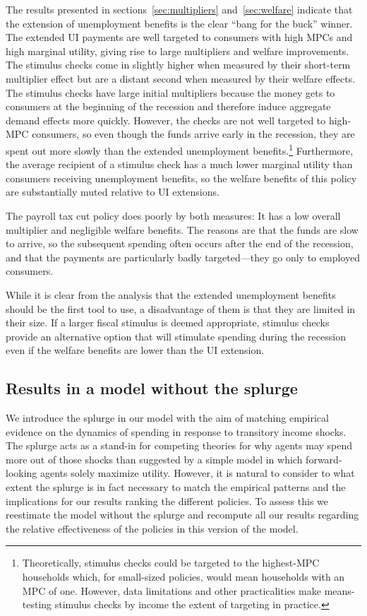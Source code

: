 \documentclass[qe]{econsocart}
\begin{document}
The results presented in sections~\ref{sec:multipliers} and~\ref{sec:welfare} indicate that the extension of unemployment benefits is the clear ``bang for the buck'' winner.
The extended UI payments are well targeted to consumers with high MPCs and high marginal utility, giving rise to large multipliers and welfare improvements.
The stimulus checks come in slightly higher when measured by their short-term multiplier effect but are a distant second when measured by their welfare effects.
The stimulus checks have large initial multipliers because the money gets to consumers at the beginning of the recession and therefore induce aggregate demand effects more quickly.
However, the checks are not well targeted to high-MPC consumers, so even though the funds arrive early in the recession, they are spent out more slowly than the extended unemployment benefits.\footnote{Theoretically, stimulus checks could be targeted to the highest-MPC households which, for small-sized policies, would mean households with an MPC of one.
  However, data limitations and other practicalities make means-testing stimulus checks by income the extent of targeting in practice.} Furthermore, the average recipient of a stimulus check has a much lower marginal utility than consumers receiving unemployment benefits, so the welfare benefits of this policy are substantially muted relative to UI extensions.

The payroll tax cut policy does poorly by both measures: It has a low overall multiplier and negligible welfare benefits.
The reasons are that the funds are slow to arrive, so the subsequent spending often occurs after the end of the recession, and that the payments are particularly badly targeted---they go only to employed consumers.

While it is clear from the analysis that the extended unemployment benefits should be the first tool to use, a disadvantage of them is that they are limited in their size.
If a larger fiscal stimulus is deemed appropriate, stimulus checks provide an alternative option that will stimulate spending during the recession even if the welfare benefits are lower than the UI extension.

\FloatBarrier
\subsection{Results in a model without the splurge}
\label{subsec:Model-without-splurge}

We introduce the splurge in our model with the aim of matching empirical evidence on the dynamics of spending in response to transitory income shocks.
The splurge acts as a stand-in for competing theories for why agents may spend more out of those shocks than suggested by a simple model in which forward-looking agents solely maximize utility.
However, it is natural to consider to what extent the splurge is in fact necessary to match the empirical patterns and the implications for our results ranking the different policies.
To assess this we  reestimate the model without the splurge and recompute all our results regarding the relative effectiveness of the policies in this version of the model.
\end{document}
